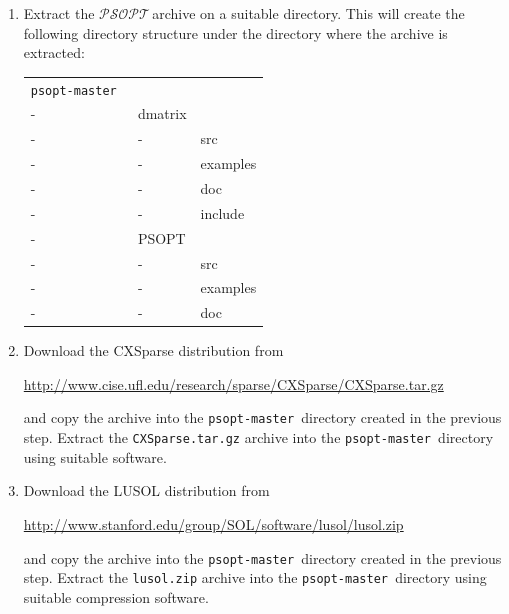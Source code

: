 \documentclass[a4paper,11pt]{report}    %
\newcommand{\psopt}{$\mathcal{PSOPT}$\,}  %
\newcommand{\basedir}{\texttt{psopt-master\,}}
\begin{document}
\begin{enumerate}
\verb|http://www.tatsuromatsuoka.com/gnuplot/Eng/winbin/|

Extract the GNUplot zip archive into the \verb|C:\| folder, and add the following
directory to your Windows PATH environment variable

\verb|C:\gp45-winbin\gnuplot\binary|


\textit{Important:}  Note also that the user needs to manually enter the command \texttt{quit} 
at the GNUplot prompt  for each plot that is produced.



\item Extract the \psopt archive on a suitable directory.
This will create the following directory structure under the directory where
the archive is extracted:

\begin{tabular}{lll}
   \basedir \\
    - & dmatrix \\
    - &  -     &  src \\
    - &  -     &  examples\\
    - &  -     &  doc \\
    - &  -     &  include \\
    - & PSOPT \\
    - &  -     &  src \\
    - &  -     &  examples\\
    - &  -     &  doc
\end{tabular}

\item Download the CXSparse distribution from 

\href{http://www.cise.ufl.edu/research/sparse/CXSparse/CXSparse.tar.gz}{http://www.cise.ufl.edu/research/sparse/CXSparse/CXSparse.tar.gz}

and copy the archive into the \basedir directory created in the previous step. Extract the \texttt{CXSparse.tar.gz} archive into the \basedir directory using suitable software.

\item Download the LUSOL distribution from 

\href{http://www.stanford.edu/group/SOL/software/lusol/lusol.zip}{http://www.stanford.edu/group/SOL/software/lusol/lusol.zip}

and copy the archive into the \basedir directory created in the previous step. Extract the \texttt{lusol.zip} archive into the \basedir directory using suitable compression software.


\end{enumerate}
\end{document}
